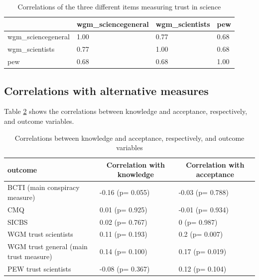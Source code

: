 \documentclass[
  doc,floatsintext]{apa6}
\begin{document}
\begin{table}[h]

\begin{center}
\begin{threeparttable}

\caption{\label{tab:exp3-correlation-trust}Correlations of the three different items measuring trust in science}

\begin{tabular}{llll}
\toprule
 & \multicolumn{1}{c}{wgm\_sciencegeneral} & \multicolumn{1}{c}{wgm\_scientists} & \multicolumn{1}{c}{pew}\\
\midrule
wgm\_sciencegeneral & 1.00 & 0.77 & 0.68\\
wgm\_scientists & 0.77 & 1.00 & 0.68\\
pew & 0.68 & 0.68 & 1.00\\
\bottomrule
\end{tabular}

\end{threeparttable}
\end{center}

\end{table}

\subsection{Correlations with alternative measures}\label{correlations-with-alternative-measures-2}

Table \ref{tab:exp3-correlations-outcomes} shows the correlations between knowledge and acceptance, respectively, and outcome variables.

\begin{table}[tbp]

\begin{center}
\begin{threeparttable}

\caption{\label{tab:exp3-correlations-outcomes}Correlations between knowledge and acceptance, respectively, and outcome variables}

\begin{tabular}{lll}
\toprule
outcome & \multicolumn{1}{c}{Correlation with knowledge} & \multicolumn{1}{c}{Correlation with acceptance}\\
\midrule
BCTI (main conspiracy measure) & -0.16 (p= 0.055) & -0.03 (p= 0.788)\\
CMQ & 0.01 (p= 0.925) & -0.01 (p= 0.934)\\
SICBS & 0.02 (p= 0.767) & 0 (p= 0.987)\\
WGM trust scientists & 0.11 (p= 0.193) & 0.2 (p= 0.007)\\
WGM trust general (main trust measure) & 0.14 (p= 0.100) & 0.17 (p= 0.019)\\
PEW trust scientists & -0.08 (p= 0.367) & 0.12 (p= 0.104)\\
\bottomrule
\end{tabular}

\end{threeparttable}
\end{center}

\end{table}
\end{document}
